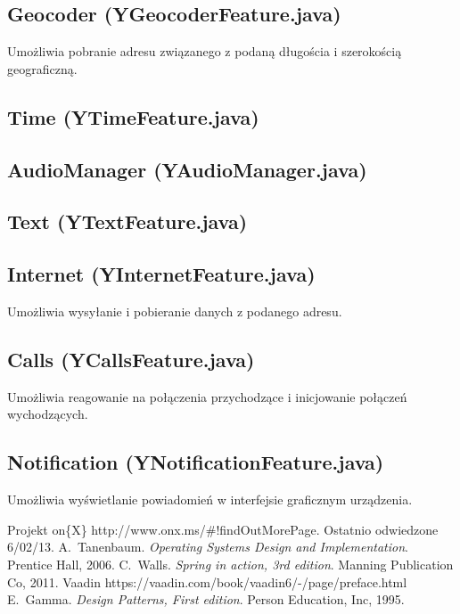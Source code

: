 \documentclass[11pt,a4paper,polish,thesis]{dcsbook}
\begin{document}
\subsection{Geocoder (YGeocoderFeature.java)}
Umożliwia pobranie adresu związanego z podaną długościa i szerokością geograficzną.

\subsection{Time (YTimeFeature.java)}

\subsection{AudioManager (YAudioManager.java)}

\subsection{Text (YTextFeature.java)}

\subsection{Internet (YInternetFeature.java)}
Umożliwia wysyłanie i pobieranie danych z podanego adresu.

\subsection{Calls (YCallsFeature.java)}
Umożliwia reagowanie na połączenia przychodzące i inicjowanie połączeń wychodzących.

\subsection{Notification (YNotificationFeature.java)}
Umożliwia wyświetlanie powiadomień w interfejsie graficznym urządzenia.

\backmatter

\begin{thebibliography}{1}
Projekt on\{X\} http://www.onx.ms/\#!findOutMorePage. Ostatnio odwiedzone 6/02/13.
A.~Tanenbaum. \emph{Operating Systems Design and Implementation}. Prentice Hall, 2006.
C.~Walls. \emph{Spring in action, 3rd edition}. Manning Publication Co, 2011.
Vaadin https://vaadin.com/book/vaadin6/-/page/preface.html 
E.~Gamma. \emph{Design Patterns, First edition}. Person Education, Inc, 1995.
\end{thebibliography}
\end{document}
